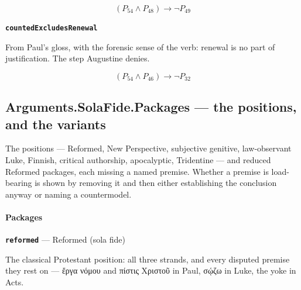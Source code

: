 \documentclass[11pt]{article}
\begin{document}
\[(P_{54} \land P_{48}) \rightarrow \lnot P_{49}\]
\par\medskip\noindent\textbf{\texttt{counted\allowbreak{}Excludes\allowbreak{}Renewal}}\par\nobreak\noindent
From Paul's gloss, with the forensic sense of the verb: renewal is no part of justification. The step Augustine denies.

\[(P_{54} \land P_{46}) \rightarrow \lnot P_{32}\]
\subsection*{Arguments.SolaFide.Packages — the positions, and the variants}
The positions — Reformed, New Perspective, subjective genitive, law-observant Luke, Finnish, critical authorship, apocalyptic, Tridentine — and reduced Reformed packages, each missing a named premise. Whether a premise is load-bearing is shown by removing it and then either establishing the conclusion anyway or naming a countermodel.

\paragraph*{Packages}
\leavevmode\par
\par\medskip\noindent\textbf{\texttt{reformed}} --- Reformed (sola fide)\par\nobreak\noindent
The classical Protestant position: all three strands, and every disputed premise they rest on — ἔργα νόμου and πίστις Χριστοῦ in Paul, σῴζω in Luke, the yoke in Acts.
\end{document}

